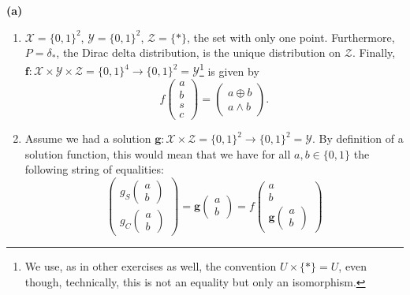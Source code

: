 \begin{gradedsolution}
  \textbf{(a)}
  \begin{enumerate}
    \item $\boldsymbol{\mathcal{X}} = \{0, 1\}^{2}$, $\boldsymbol{\mathcal{Y}} = \{0,1\}^{2}$, $\boldsymbol{\mathcal{Z}} = \{*\}$, the set with only one point. Furthermore, $P = \delta_*$, the Dirac delta distribution, is the unique distribution on $\boldsymbol{\mathcal{Z}}$. 
      Finally, $\boldsymbol{f}: \boldsymbol{\mathcal{X}} \times \boldsymbol{\mathcal{Y}} \times \boldsymbol{\mathcal{Z}} = \{0,1\}^{4} \to \{0,1\}^{2} = \boldsymbol{\mathcal{Y}}$\footnote{We use, as in other exercises as well, the convention $U \times \{*\} = U$, even though, technically, this is not an equality but only an isomorphism.} is given by
      \begin{equation}
	f \begin{pmatrix} a \\ b \\ s \\ c \end{pmatrix} = \begin{pmatrix} a \oplus b \\ a \wedge b\end{pmatrix}.
	\label{eq:causal_mechanism_half_adder}
      \end{equation}
    \item Assume we had a solution $\boldsymbol{g}: \boldsymbol{\mathcal{X}} \times \boldsymbol{\mathcal{Z}} = \{0,1\}^2 \to \{0,1\}^2 = \boldsymbol{\mathcal{Y}}$.
      By definition of a solution function, this would mean that we have for all $a, b \in \{0,1\}$ the following string of equalities:
      \begin{equation}
	\begin{pmatrix} g_S \begin{pmatrix} a \\ b\end{pmatrix} \\ g_C \begin{pmatrix} a \\ b \end{pmatrix}\end{pmatrix}
	= \boldsymbol{g} \begin{pmatrix} a \\ b\end{pmatrix} 
	= f \begin{pmatrix} a \\ b \\ \boldsymbol{g} \begin{pmatrix} a \\ b\end{pmatrix}\end{pmatrix}

\end{equation}
\end{enumerate}
\end{gradedsolution}
